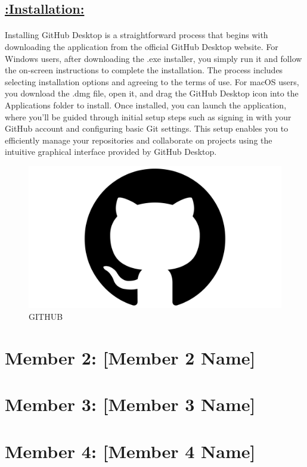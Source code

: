 \documentclass[a4paper,12pt]{article}
\begin{document}
\begin{center}
\section*{\uline{:Installation:}}
\end{center}

\paragraph{}
Installing GitHub Desktop is a straightforward process that begins with downloading the application from the official GitHub Desktop website. For Windows users, after downloading the .exe installer, you simply run it and follow the on-screen instructions to complete the installation. The process includes selecting installation options and agreeing to the terms of use. For macOS users, you download the .dmg file, open it, and drag the GitHub Desktop icon into the Applications folder to install. Once installed, you can launch the application, where you'll be guided through initial setup steps such as signing in with your GitHub account and configuring basic Git settings. This setup enables you to efficiently manage your repositories and collaborate on projects using the intuitive graphical interface provided by GitHub Desktop.

\begin{figure}[h!]
    \centering
    \includegraphics[width=0.5\linewidth]{GitHub-Symbol.png}
    \caption{GITHUB}
    
\end{figure}


\newpage

\section*{Member 2: [Member 2 Name]}
\date{\today}
\newpage

\section*{Member 3: [Member 3 Name]}
\date{\today}
\newpage

\section*{Member 4: [Member 4 Name]}
\date{\today}
\end{document}
